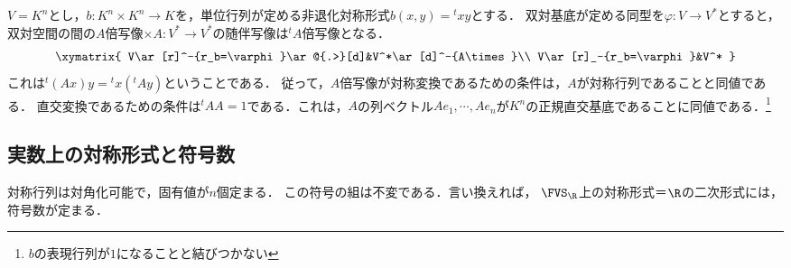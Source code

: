 \documentclass[uplatex, dvipdfmx]{jsreport}
\begin{document}
\begin{example}[標準内積に関する随伴は転置]
    $V=K^n$とし，$b:K^n\times K^n\to K$を，単位行列が定める非退化対称形式$b(x,y)={}^t\!xy$とする．
    双対基底が定める同型を$\varphi:V\to V^*$とすると，双対空間の間の$A$倍写像$\times A:V^*\to V^*$の随伴写像は${}^t\!A$倍写像となる．
    \[\xymatrix{
        V\ar[r]^-{r_b=\varphi}\ar@{.>}[d]&V^*\ar[d]^-{A\times}\\
        V\ar[r]_-{r_b=\varphi}&V^*
    }\]
    これは${}^t\!(Ax)y={}^t\!x({}^t\!Ay)$ということである．
    従って，$A$倍写像が対称変換であるための条件は，$A$が対称行列であることと同値である．
    直交変換であるための条件は${}^t\!AA=1$である．これは，$A$の列ベクトル$Ae_1,\cdots,Ae_n$が$K^n$の正規直交基底であることに同値である．\footnote{$b$の表現行列が$1$になることと結びつかない}
\end{example}

\subsection{実数上の対称形式と符号数}

\begin{tcolorbox}[colframe=ForestGreen, colback=ForestGreen!10!white, breakable]
    対称行列は対角化可能で，固有値が$n$個定まる．
    この符号の組は不変である．言い換えれば，
    $\FVS_\R$上の対称形式＝$\R$の二次形式には，
    符号数が定まる．
\end{tcolorbox}
\end{document}
